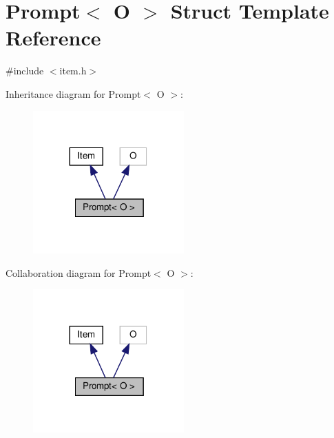 \hypertarget{structPrompt}{}\section{Prompt$<$ O $>$ Struct Template Reference}
\label{structPrompt}


{\ttfamily \#include $<$item.\+h$>$}



Inheritance diagram for Prompt$<$ O $>$\+:\nopagebreak
\begin{figure}[H]
\begin{center}
\leavevmode
\includegraphics[width=164pt]{structPrompt__inherit__graph}
\end{center}
\end{figure}


Collaboration diagram for Prompt$<$ O $>$\+:\nopagebreak
\begin{figure}[H]
\begin{center}
\leavevmode
\includegraphics[width=164pt]{structPrompt__coll__graph}
\end{center}
\end{figure}
